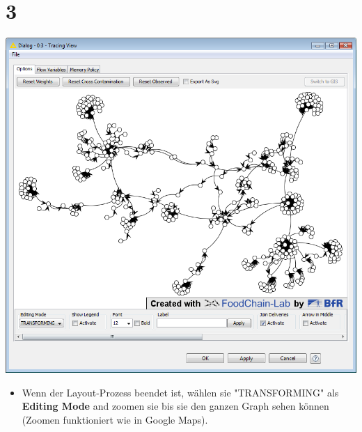 \documentclass{beamer}
\begin{document}
\section{3}
\begin{frame}
	\begin{center}
  		\includegraphics[height=0.6\textheight]{3.png}
	\end{center}
	\begin{itemize}
		\item Wenn der Layout-Prozess beendet ist, wählen sie "TRANSFORMING" als \textbf{Editing Mode} and zoomen sie bis sie den ganzen Graph sehen können (Zoomen funktioniert wie in Google Maps).
	\end{itemize}
\end{frame}
\end{document}
